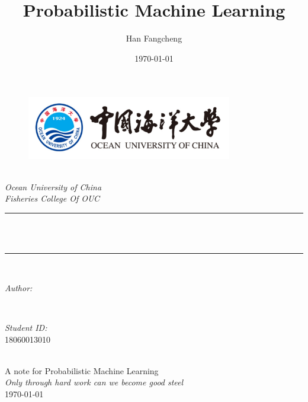 \documentclass{article}
\title{Probabilistic Machine Learning}
\author{Han Fangcheng}
\date{\today}
\numberwithin{equation}{section}
\begin{document}
\begin{titlepage}
    \newcommand{\HRule}{\rule{\linewidth}{0.5mm}}
    \begin{figure}[hptb]
        \centering
        \includegraphics[width=0.8\textwidth]{../image/logo.jpg}\\[1cm]
    \end{figure}
    \center
    \quad\\[0.5cm]
    \textsl{\Large Ocean University of China }\\[0.5cm]
    \textsl{\large Fisheries College Of OUC}\\[0.5cm]
    \makeatletter
    \HRule \\[0.4cm]
    { \large \bfseries \@title}\\[0.4cm]
    \HRule \\[1.5cm]
    \begin{minipage}{0.4\textwidth}
        \begin{flushleft} \large
            \emph{Author:}\\
            \@author
        \end{flushleft}
    \end{minipage}
    ~
    \begin{minipage}{0.4\textwidth}
        \begin{flushright} \large
            \emph{Student ID:} \\
            \textup{18060013010}
        \end{flushright}
    \end{minipage}\\[3cm]
    \makeatother
    {\large A note for Probabilistic Machine Learning}\\[0.5cm]
    {\large \emph{Only through hard work can we become good steel}}\\[0.5cm]
    {\large \today}\\[2cm]
    \vfill
\end{titlepage}
\newpage
{}
\setcounter{page}{1}
\tableofcontents
\newpage
{}
\setcounter{page}{1}


\end{document}
